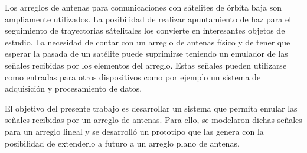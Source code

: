 \documentclass[class=article, crop=false]{standalone}
\begin{document}
Los arreglos de antenas para comunicaciones con sátelites de órbita baja son ampliamente utilizados.
La posibilidad de realizar apuntamiento de haz para el seguimiento de trayectorias sátelitales los convierte en interesantes objetos de estudio.
La necesidad de contar con un arreglo de antenas físico y de tener que esperar la pasada de un satélite puede suprimirse teniendo un emulador de las señales recibidas por los elementos del arreglo.
Estas señales pueden utilizarse como entradas para otros dispositivos como por ejemplo un sistema de adquisición y procesamiento de datos.

El objetivo del presente trabajo es desarrollar un sistema que permita emular las señales recibidas por un arreglo de antenas.
Para ello, se modelaron dichas señales para un arreglo lineal y se desarrolló un prototipo que las genera con la posibilidad de extenderlo a futuro a un arreglo plano de antenas.


%
%
%
%
\end{document}

